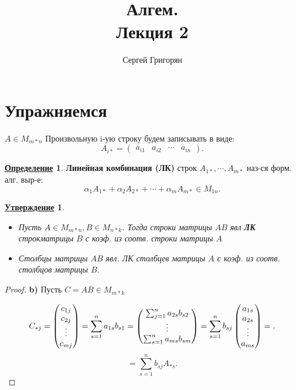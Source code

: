 \documentclass[12pt]{article}
\title{Алгем. \\ Лекция 2}
\author{Сергей Григорян}
\newtheorem{statement}{\underline{Утверждение}}[section]
\theoremstyle{definition}
\newtheorem{definition}{\underline{Определение}}[section]
\theoremstyle{definition}
\begin{document}
\maketitle
\newpage
\section{Упражняемся}
$A \in M_{m*n}$
 Произвольную i-ую строку будем записывать в виде:
 \[
     A_{i*} = \begin{pmatrix} a_{i1} & a_{i2} & \cdots & a_{in}\end{pmatrix}
 .\] 

 \begin{definition}
     \textbf{Линейная комбинация (ЛК)} строк $A_{1*}, \cdots , A_{m*}$ наз-ся форм. алг. выр-е:
 \[
 \alpha_1 A_{1*} + \alpha_2 A_{2*} + \cdots + \alpha_m A_{m*}  \in M_{1n}
 .\] 
 \end{definition}

 \begin{statement}
     \begin{itemize}
         \item [a) ]  Пусть $A  \in M_{m*n}, B \in M_{n*k}$. Тогда строки матрицы $AB$ явл \textbf{ЛК} строкматрицы $B$ с коэф. из соотв. строки матрицы $A$
         \item [b) ] Столбцы матрицы $AB$ явл. ЛК столбцев матрицы $A$ с коэф. из соотв. столбцов матрицы $B$. 
     \end{itemize}

 \end{statement}
 \begin{proof}
 \textbf{b) } Пусть $C = AB  \in M_{m*k}$

  \[
  C_{*j} = \begin{pmatrix}c_{1j} \\ c_{2j} \\ \vdots \\ c_{mj} \end{pmatrix} = \sum_{s=1}^{n} a_{1s}b_{s1} \\ = \begin{pmatrix} \sum_{j = 1}^{n} a_{2s}b_{s2} \\ \vdots \\ \sum_{s = 1}^{n} a_{ms} b_{sm} \end{pmatrix} = \sum_{s = 1}^{n} b_{sj} \begin{pmatrix}a_{1s} \\ a_{2s} \\ \vdots \\ a_{ms} \end{pmatrix} = 
  .\] 
  \[
= \sum_{s = 1}^{n}  b_{sj} A_{*s}
  .\] 
 \end{proof}
 
\end{document}

